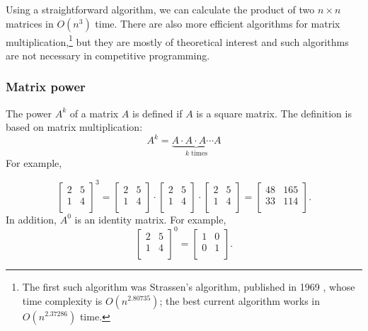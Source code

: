 Using a straightforward algorithm,
we can calculate the product of
two $n \times n$ matrices
in $O(n^3)$ time.
There are also more efficient algorithms
for matrix multiplication,\footnote{The first such
    algorithm was Strassen's algorithm,
    published in 1969 \cite{str69},
    whose time complexity is $O(n^{2.80735})$;
    the best current algorithm \cite{gal14}
    works in $O(n^{2.37286})$ time.}
but they are mostly of theoretical interest
and such algorithms are not necessary
in competitive programming.


\subsubsection{Matrix power}


The power $A^k$ of a matrix $A$ is defined
if $A$ is a square matrix.
The definition is based on matrix multiplication:
\[ A^k = \underbrace{A \cdot A \cdot A \cdots A}_{\textrm{$k$ times}} \]
For example,

\[
    \begin{bmatrix}
        2 & 5 \\
        1 & 4 \\
    \end{bmatrix}^3 =
    \begin{bmatrix}
        2 & 5 \\
        1 & 4 \\
    \end{bmatrix} \cdot
    \begin{bmatrix}
        2 & 5 \\
        1 & 4 \\
    \end{bmatrix} \cdot
    \begin{bmatrix}
        2 & 5 \\
        1 & 4 \\
    \end{bmatrix} =
    \begin{bmatrix}
        48 & 165 \\
        33 & 114 \\
    \end{bmatrix}.
\]
In addition, $A^0$ is an identity matrix. For example,
\[
    \begin{bmatrix}
        2 & 5 \\
        1 & 4 \\
    \end{bmatrix}^0 =
    \begin{bmatrix}
        1 & 0 \\
        0 & 1 \\
    \end{bmatrix}.
\]

